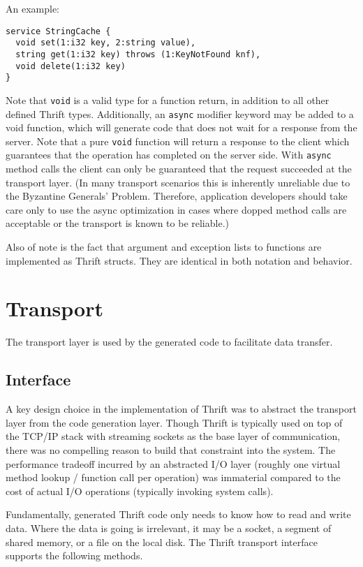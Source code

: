 \documentclass[nocopyrightspace,blockstyle]{sigplanconf}
\begin{document}
An example:

\begin{verbatim}
service StringCache {
  void set(1:i32 key, 2:string value),
  string get(1:i32 key) throws (1:KeyNotFound knf),
  void delete(1:i32 key) 
}
\end{verbatim}

Note that \texttt{void} is a valid type for a function return, in addition to
all other defined Thrift types. Additionally, an \texttt{async} modifier
keyword may be added to a void function, which will generate code that does
not wait for a response from the server. Note that a pure \texttt{void}
function will return a response to the client which guarantees that the
operation has completed on the server side. With \texttt{async} method calls
the client can only be guaranteed that the request succeeded at the
transport layer. (In many transport scenarios this is inherently unreliable
due to the Byzantine Generals' Problem. Therefore, application developers
should take care only to use the async optimization in cases where dopped
method calls are acceptable or the transport is known to be reliable.)

Also of note is the fact that argument and exception lists to functions are
implemented as Thrift structs. They are identical in both notation and
behavior.

\section{Transport}

The transport layer is used by the generated code to facilitate data transfer.

\subsection{Interface}

A key design choice in the implementation of Thrift was to abstract the
transport layer from the code generation layer. Though Thrift is typically
used on top of the TCP/IP stack with streaming sockets as the base layer of
communication, there was no compelling reason to build that constraint into 
the system. The performance tradeoff incurred by an abstracted I/O layer
(roughly one virtual method lookup / function call per operation) was
immaterial compared to the cost of actual I/O operations (typically invoking
system calls).

Fundamentally, generated Thrift code only needs to know how to read and
write data. Where the data is going is irrelevant, it may be a socket, a
segment of shared memory, or a file on the local disk. The Thrift transport
interface supports the following methods.
\end{document}
